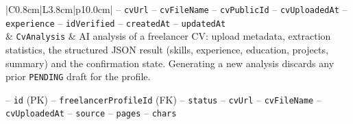 \begin{center}
\begin{longtable}{|C{0.8cm}|L{3.8cm}|p{10.0cm}|}
\hspace*{1em}-- \texttt{cv\allowbreak Url} \newline
\hspace*{1em}-- \texttt{cv\allowbreak File\allowbreak Name} \newline
\hspace*{1em}-- \texttt{cv\allowbreak Public\allowbreak Id} \newline
\hspace*{1em}-- \texttt{cv\allowbreak Uploaded\allowbreak At} \newline
\hspace*{1em}-- \texttt{experience} \newline
\hspace*{1em}-- \texttt{id\allowbreak Verified} \newline
\hspace*{1em}-- \texttt{created\allowbreak At} \newline
\hspace*{1em}-- \texttt{updated\allowbreak At} \\
 & \texttt{Cv\allowbreak Analysis} & AI analysis of a freelancer CV: upload metadata, extraction statistics, the structured JSON result (skills, experience, education, projects, summary) and the confirmation state. Generating a new analysis discards any prior \texttt{PENDING} draft for the profile.\par\smallskip
\hspace*{1em}-- \texttt{id} (PK) \newline
\hspace*{1em}-- \texttt{freelancer\allowbreak Profile\allowbreak Id} (FK) \newline
\hspace*{1em}-- \texttt{status} \newline
\hspace*{1em}-- \texttt{cv\allowbreak Url} \newline
\hspace*{1em}-- \texttt{cv\allowbreak File\allowbreak Name} \newline
\hspace*{1em}-- \texttt{cv\allowbreak Uploaded\allowbreak At} \newline
\hspace*{1em}-- \texttt{source} \newline
\hspace*{1em}-- \texttt{pages} \newline
\hspace*{1em}-- \texttt{chars} \newline

\end{longtable}
\end{center}

